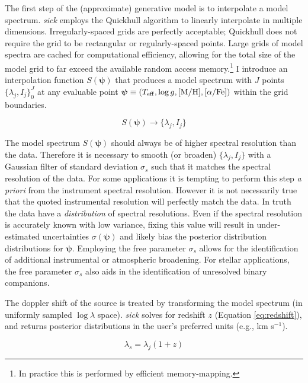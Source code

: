 \documentclass{aastex}
\newcommand{\sick}{\textit{sick}}
\begin{document}
The first step of the (approximate) generative model is to interpolate a model 
spectrum. \sick{} employs the Quickhull algorithm \citep{quickhull} to linearly 
interpolate in multiple dimensions. Irregularly-spaced grids are perfectly 
acceptable; Quickhull does not require the grid to be rectangular or 
regularly-spaced points. Large grids of model spectra are cached for 
computational efficiency, allowing for the total size of the model grid to far 
exceed the available random access memory.\footnote{In practice this is performed 
by efficient memory-mapping.} I introduce an interpolation function $S(\bm{\psi})$ 
that produces a model spectrum with $J$ points $\{\lambda_j,I_j\}_{0}^{J}$ at 
any evaluable point $\bm{\psi} \equiv (T_{\rm eff},\log{g},{\rm [M/H]},[\alpha/{\rm Fe}])$ 
within the grid boundaries.

\begin{equation}
S(\bm{\psi}) \rightarrow \{\lambda_j,I_j\}
\end{equation}

The model spectrum $S(\bm{\psi})$ should always be of higher spectral resolution 
than the data. Therefore it is necessary to smooth (or broaden) $\{\lambda_j,I_j\}$ 
with a Gaussian filter of standard deviation $\sigma_{s}$ such that it matches 
the spectral resolution of the data. For some applications it is tempting to 
perform this step \textit{a priori} from the instrument spectral resolution. 
However it is not necessarily true that the quoted instrumental resolution will 
perfectly match the data. In truth the data have a \textit{distribution} of 
spectral resolutions. Even if the spectral resolution is accurately known with 
low variance, fixing this value will result in under-estimated uncertainties 
$\sigma(\bm{\psi})$ and likely bias the posterior distribution distributions for 
$\bm{\psi}$. Employing the free parameter $\sigma_{s}$ allows for the 
identification of additional instrumental or atmospheric broadening. For stellar 
applications, the free parameter $\sigma_{s}$ also aids in the identification of 
unresolved binary companions.

The doppler shift of the source is treated by transforming the model spectrum 
(in uniformly sampled $\log\lambda$ space). \sick{} solves for redshift $z$ 
(Equation \ref{eq:redshift}), and returns posterior distributions in the user's 
preferred units (e.g., km s$^{-1}$).

\begin{equation}
\label{eq:redshift}
\lambda_{s} = \lambda_{j}(1 + z)
\end{equation}
\end{document}

